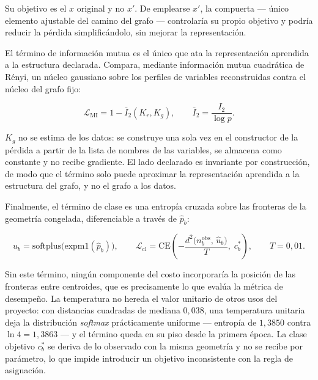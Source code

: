 \documentclass[11pt,a4paper]{article}
\begin{document}
Su objetivo es el $x$ original y no $x'$. De emplearse $x'$, la compuerta --- único elemento
ajustable del camino del grafo --- controlaría su propio objetivo y podría reducir la pérdida
simplificándolo, sin mejorar la representación.

El término de información mutua es el único que ata la representación aprendida a la estructura
declarada. Compara, mediante información mutua cuadrática de Rényi, un núcleo gaussiano sobre
los perfiles de variables reconstruidas contra el núcleo del grafo fijo:

\begin{equation}
\mathcal{L}_{\mathrm{MI}} = 1 - \bar{I}_2(K_r, K_g),
\qquad
\bar{I}_2 = \frac{I_2}{\log p} .
\end{equation}

$K_g$ no se estima de los datos: se construye una sola vez en el constructor de la pérdida a
partir de la lista de nombres de las variables, se almacena como constante y no recibe
gradiente. El lado declarado es invariante por construcción, de modo que el término solo puede
aproximar la representación aprendida a la estructura del grafo, y no el grafo a los datos.

Finalmente, el término de clase es una entropía cruzada sobre las fronteras de la geometría
congelada, diferenciable a través de $\hat{p}_b$:

\begin{equation}
\hat{u}_b = \mathrm{softplus}\!\big(\mathrm{expm1}(\hat{p}_b)\big),
\qquad
\mathcal{L}_{\mathrm{cl}} = \mathrm{CE}\!\left(-\frac{d^2\big(n^{\mathrm{obs}}_b,\, \hat{u}_b\big)}{T},\; c^{*}_b\right),
\qquad T = 0{,}01 .
\end{equation}

Sin este término, ningún componente del costo incorporaría la posición de las fronteras entre
centroides, que es precisamente lo que evalúa la métrica de desempeño. La temperatura no hereda
el valor unitario de otros usos del proyecto: con distancias cuadradas de mediana $0{,}038$, una
temperatura unitaria deja la distribución \emph{softmax} prácticamente uniforme --- entropía de
$1{,}3850$ contra $\ln 4 = 1{,}3863$ --- y el término queda en su piso desde la primera época.
La clase objetivo $c^{*}_b$ se deriva de lo observado con la misma geometría y no se recibe por
parámetro, lo que impide introducir un objetivo inconsistente con la regla de asignación.
\end{document}
